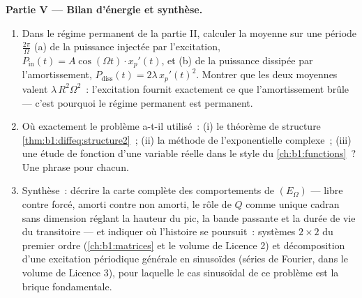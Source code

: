 \begin{problem}
\medskip
\noindent\textbf{Partie V --- Bilan d'énergie et synthèse.}
\begin{enumerate}[resume]
  \item Dans le régime permanent de la partie II, calculer la moyenne
        sur une période $\frac{2\pi}\Omega$ (a) de la puissance
        injectée par l'excitation, $P_{\mathrm{in}}(t) = A\cos(\Omega
        t) \cdot x_p'(t)$, et (b) de la puissance dissipée par
        l'amortissement, $P_{\mathrm{diss}}(t) = 2\lambda\,x_p'(t)^2$.
        Montrer que les deux moyennes valent $\lambda\,R^2\Omega^2$~:
        l'excitation fournit exactement ce que l'amortissement brûle
        --- c'est pourquoi le régime permanent est permanent.
  \item Où exactement le problème a-t-il utilisé~: (i) le théorème de
        structure \cref{thm:b1:diffeq:structure2}~; (ii) la méthode de
        l'exponentielle complexe~; (iii) une étude de fonction d'une
        variable réelle dans le style du \cref{ch:b1:functions}~? Une
        phrase pour chacun.
  \item Synthèse~: décrire la carte complète des comportements de
        $(E_\Omega)$ --- libre contre forcé, amorti contre non amorti,
        le rôle de $Q$ comme unique cadran sans dimension réglant la
        hauteur du pic, la bande passante et la durée de vie du
        transitoire --- et indiquer où l'histoire se poursuit~:
        systèmes $2 \times 2$ du premier ordre (\cref{ch:b1:matrices}
        et le volume de Licence 2) et décomposition d'une excitation
        périodique générale en sinusoïdes (séries de Fourier, dans le
        volume de Licence 3), pour laquelle le cas sinusoïdal de ce
        problème est la brique fondamentale.
\end{enumerate}
\end{problem}
